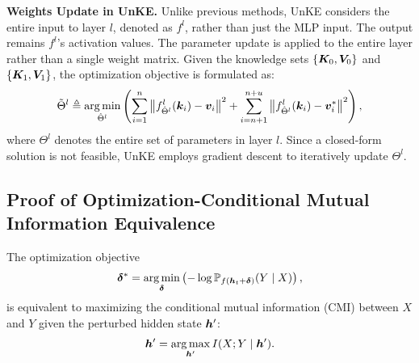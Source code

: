 \textbf{Weights Update in UnKE.} Unlike previous methods, UnKE considers the entire input to layer $l$, denoted as $f^l$, rather than just the MLP input. The output remains $f^l$'s activation values. The parameter update is applied to the entire layer rather than a single weight matrix. Given the knowledge sets $\{{\bm{K}}_0, {\bm{V}}_0\}$ and $\{{\bm{K}}_1, {\bm{V}}_1\}$, the optimization objective is formulated as:
\begin{equation}
    \tilde{\Theta}^l \triangleq \operatorname*{arg\,min}_{\hat{\Theta}^l} \left( \sum_{i=1}^{n} \left\|  f_{\hat{\Theta}^l}^l({\bm{k}}_i) - {\bm{v}}_i \right\|^2 + \sum_{i=n+1}^{n+u} \left\|  f_{\hat{\Theta}^l}^l({\bm{k}}_i) - {\bm{v}}^\ast_i \right\|^2 \right),
\end{equation}
where $\Theta^l$ denotes the entire set of parameters in layer $l$. Since a closed-form solution is not feasible, UnKE employs gradient descent to iteratively update $\Theta^l$.

\subsection{Proof of Optimization-Conditional Mutual Information Equivalence} \label{app:proof_cmi}
\begin{theorem}
The optimization objective  
\begin{equation}
    \bm{\delta}^* = \operatorname*{arg\,min}_{\bm{\delta}} \left( -\log \mathbb{P}_{f({\bm{h}}_t+\bm{\delta})}(Y \mid X) \right), \label{eq:opt}
\end{equation}  
is equivalent to maximizing the conditional mutual information (CMI) between $X$ and $Y$ given the perturbed hidden state ${\bm{h}}'$:  
\begin{equation}
    {\bm{h}}' = \operatorname*{arg\,max}_{{\bm{h}}'} I(X; Y \mid {\bm{h}}'). \label{eq:cmi}
\end{equation}
\end{theorem}

